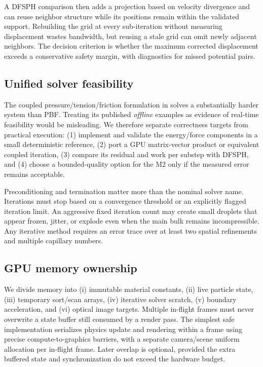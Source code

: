 \documentclass[10pt,a4paper]{article}
\begin{document}
A DFSPH comparison then adds a projection based on velocity divergence and can reuse neighbor structure while its positions remain within the validated support. Rebuilding the grid at every sub-iteration without measuring displacement wastes bandwidth, but reusing a stale grid can omit newly adjacent neighbors. The decision criterion is whether the maximum corrected displacement exceeds a conservative safety margin, with diagnostics for missed potential pairs.

\subsection{Unified solver feasibility}
The coupled pressure/tension/friction formulation in \citep{probst2024} solves a substantially harder system than PBF. Treating its published \emph{offline} examples as evidence of real-time feasibility would be misleading. We therefore separate correctness targets from practical execution: (1) implement and validate the energy/force components in a small deterministic reference, (2) port a GPU matrix-vector product or equivalent coupled iteration, (3) compare its residual and work per substep with DFSPH, and (4) choose a bounded-quality option for the M2 only if the measured error remains acceptable.

Preconditioning and termination matter more than the nominal solver name. Iterations must stop based on a convergence threshold or an explicitly flagged iteration limit. An aggressive fixed iteration count may create small droplets that appear frozen, jitter, or explode even when the main bulk remains incompressible. Any iterative method requires an error trace over at least two spatial refinements and multiple capillary numbers.

\subsection{GPU memory ownership}
We divide memory into (i) immutable material constants, (ii) live particle state, (iii) temporary sort/scan arrays, (iv) iterative solver scratch, (v) boundary acceleration, and (vi) optical image targets. Multiple in-flight frames must never overwrite a state buffer still consumed by a render pass. The simplest safe implementation serializes physics update and rendering within a frame using precise compute-to-graphics barriers, with a separate camera/scene uniform allocation per in-flight frame. Later overlap is optional, provided the extra buffered state and synchronization do not exceed the hardware budget.
\end{document}

